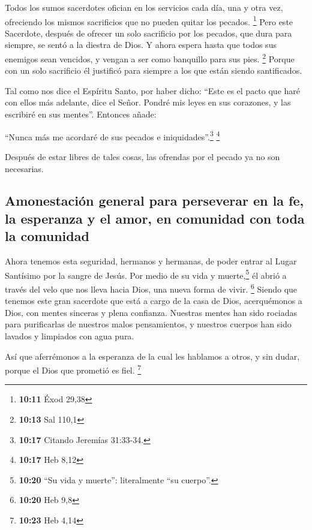  Todos los sumos sacerdotes ofician en los servicios cada
día, una y otra vez, ofreciendo los mismos sacrificios que no pueden
quitar los pecados. \footnote{\textbf{10:11} Éxod 29,38} 
Pero este Sacerdote, después de ofrecer un solo sacrificio por los
pecados, que dura para siempre, se sentó a la diestra de Dios.
 Y ahora espera hasta que todos sus enemigos sean
vencidos, y vengan a ser como banquillo para sus pies. \footnote{\textbf{10:13}
  Sal 110,1}  Porque con un solo sacrificio él justificó
para siempre a los que están siendo santificados.

 Tal como nos dice el Espíritu Santo, por haber dicho:
 ``Este es el pacto que haré con ellos más adelante, dice
el Señor. Pondré mis leyes en sus corazones, y las escribiré en sus
mentes''. Entonces añade:

 ``Nunca más me acordaré de sus pecados e
iniquidades''.\footnote{\textbf{10:17} Citando Jeremías 31:33-34.}
\footnote{\textbf{10:17} Heb 8,12}

 Después de estar libres de tales cosas, las ofrendas por
el pecado ya no son necesarias.

\hypertarget{amonestaciuxf3n-general-para-perseverar-en-la-fe-la-esperanza-y-el-amor-en-comunidad-con-toda-la-comunidad}{%
\subsection{Amonestación general para perseverar en la fe, la esperanza
y el amor, en comunidad con toda la
comunidad}\label{amonestaciuxf3n-general-para-perseverar-en-la-fe-la-esperanza-y-el-amor-en-comunidad-con-toda-la-comunidad}}

 Ahora tenemos esta seguridad, hermanos y hermanas, de
poder entrar al Lugar Santísimo por la sangre de Jesús. 
Por medio de su vida y muerte,\footnote{\textbf{10:20} ``Su vida y
  muerte'': literalmente ``su cuerpo''.} él abrió a través del velo que
nos lleva hacia Dios, una nueva forma de vivir. \footnote{\textbf{10:20}
  Heb 9,8}  Siendo que tenemos este gran sacerdote que
está a cargo de la casa de Dios,  acerquémonos a Dios,
con mentes sinceras y plena confianza. Nuestras mentes han sido rociadas
para purificarlas de nuestros malos pensamientos, y nuestros cuerpos han
sido lavados y limpiados con agua pura.

 Así que aferrémonos a la esperanza de la cual les
hablamos a otros, y sin dudar, porque el Dios que prometió es fiel.
\footnote{\textbf{10:23} Heb 4,14}

